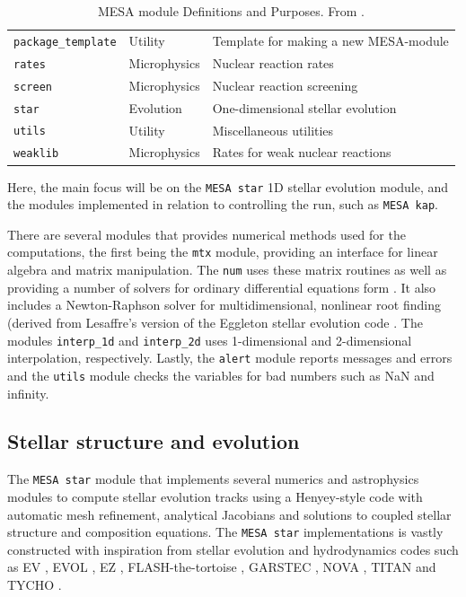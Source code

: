 \begin{table}[htbp]
{\begin{tabular}{lll}
\texttt{package\_template}  & Utility          &    Template for making a new MESA-module            \\
\texttt{rates}              & Microphysics     &    Nuclear reaction rates                          \\
\texttt{screen}             & Microphysics     &    Nuclear reaction screening                          \\
\texttt{star}               & Evolution        &    One-dimensional stellar evolution                          \\
\texttt{utils}              & Utility          &    Miscellaneous utilities                          \\ 
\texttt{weaklib}            & Microphysics     &    Rates for weak nuclear reactions                        \\ \hline
\end{tabular}
}
\caption{MESA module Definitions and Purposes. From \citep{paxton2010}.}
\label{modules}
\end{table}
 
Here, the main focus will be on the \texttt{MESA star} 1D stellar evolution module, and the modules implemented in relation to controlling the run, such as \texttt{MESA kap}. 

There are several modules that provides numerical methods used for the computations, the first being the  \texttt{mtx} module, providing an interface for linear algebra and matrix manipulation. The \texttt{num} uses these matrix routines as well as providing a number of solvers for ordinary differential equations form \citet{wanner1996solving}. It also includes a Newton-Raphson solver for multidimensional, nonlinear root finding (derived from Lesaffre's version of the Eggleton stellar evolution code \citep{eggleton1971evolution, pols1995approximate, lesaffre2006c}. The modules \texttt{interp\_1d} and \texttt{interp\_2d} uses 1-dimensional and 2-dimensional interpolation, respectively. Lastly, the \texttt{alert} module reports messages and errors and the \texttt{utils} module checks the variables for bad numbers such as NaN and infinity. 

\subsection{Stellar structure and evolution}

The \texttt{MESA star} module that implements several numerics and astrophysics modules to compute stellar evolution tracks using a Henyey-style code \citep{henyey1959method} with automatic mesh refinement, analytical Jacobians and solutions to coupled stellar structure and composition equations. The \texttt{MESA star} implementations is vastly constructed with inspiration from stellar evolution and hydrodynamics codes such as EV \citep{eggleton1971evolution}, EVOL \citep{herwig2004evolution}, EZ \citep{paxton2004ez}, FLASH-the-tortoise \citep{lesaffre2006c}, GARSTEC \citep{weiss2008garstec}, NOVA \citep{starrfield2000effects}, TITAN \citep{gehmeyr1994adaptive} and TYCHO \citep{young2005observational}.

